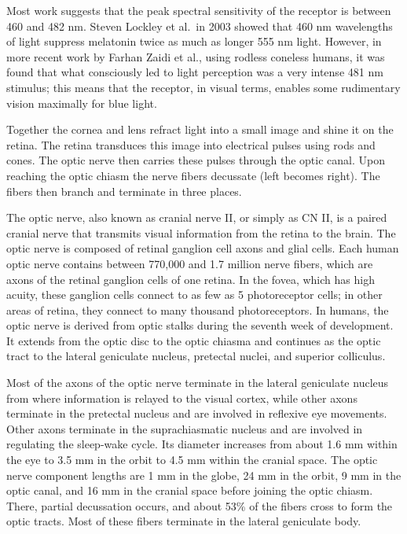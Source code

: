 \documentclass[]{book}
\begin{document}
Most work suggests that the peak spectral sensitivity of the receptor is between 460 and 482 nm. Steven Lockley et al.~in 2003 showed that 460 nm wavelengths of light suppress melatonin twice as much as longer 555 nm light. However, in more recent work by Farhan Zaidi et al., using rodless coneless humans, it was found that what consciously led to light perception was a very intense 481 nm stimulus; this means that the receptor, in visual terms, enables some rudimentary vision maximally for blue light.

Together the cornea and lens refract light into a small image and shine it on the retina. The retina transduces this image into electrical pulses using rods and cones. The optic nerve then carries these pulses through the optic canal. Upon reaching the optic chiasm the nerve fibers decussate (left becomes right). The fibers then branch and terminate in three places.

The optic nerve, also known as cranial nerve II, or simply as CN II, is a paired cranial nerve that transmits visual information from the retina to the brain. The optic nerve is composed of retinal ganglion cell axons and glial cells. Each human optic nerve contains between 770,000 and 1.7 million nerve fibers, which are axons of the retinal ganglion cells of one retina. In the fovea, which has high acuity, these ganglion cells connect to as few as 5 photoreceptor cells; in other areas of retina, they connect to many thousand photoreceptors.
In humans, the optic nerve is derived from optic stalks during the seventh week of development. It extends from the optic disc to the optic chiasma and continues as the optic tract to the lateral geniculate nucleus, pretectal nuclei, and superior colliculus.

Most of the axons of the optic nerve terminate in the lateral geniculate nucleus from where information is relayed to the visual cortex, while other axons terminate in the pretectal nucleus and are involved in reflexive eye movements. Other axons terminate in the suprachiasmatic nucleus and are involved in regulating the sleep-wake cycle. Its diameter increases from about 1.6 mm within the eye to 3.5 mm in the orbit to 4.5 mm within the cranial space. The optic nerve component lengths are 1 mm in the globe, 24 mm in the orbit, 9 mm in the optic canal, and 16 mm in the cranial space before joining the optic chiasm. There, partial decussation occurs, and about 53\% of the fibers cross to form the optic tracts. Most of these fibers terminate in the lateral geniculate body.
\end{document}
